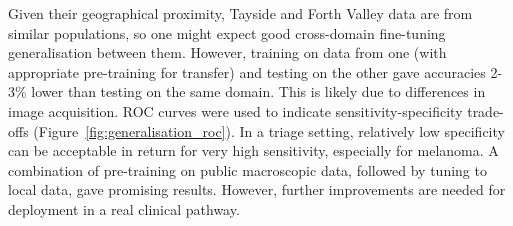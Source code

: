 Given their geographical proximity, Tayside and Forth Valley data are from similar populations, so one might expect good cross-domain fine-tuning generalisation between them. However, training on data from one (with appropriate pre-training for transfer) and testing on the other gave accuracies 2-3\% lower than testing on the same domain. This is likely due to differences in image acquisition. ROC curves were used to indicate sensitivity-specificity trade-offs (Figure~\ref{fig:generalisation_roc}). In a triage setting, relatively low specificity can be acceptable in return for very high sensitivity, especially for melanoma. A combination of pre-training on public macroscopic data, followed by tuning to local data, gave promising results. However, further improvements are needed for deployment in a real clinical pathway.